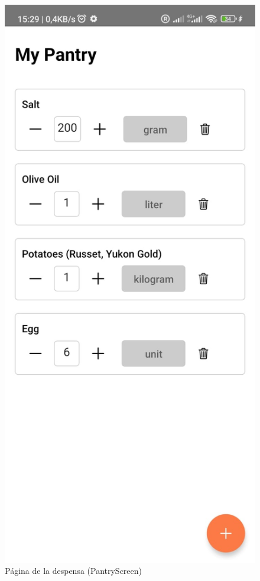 \documentclass[twoside, openright, 11pt]{report}
\begin{document}
				\begin{figure}[H]
					\centering
					\includegraphics[scale=0.3]{imagenes/PantryScreen}
					\caption{Página de la despensa (PantryScreen)}
					\label{fig:PantryScreen}
				\end{figure}
				
\end{document}
